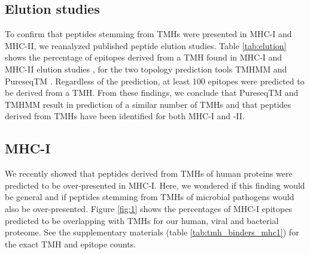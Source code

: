\subsection{Elution studies}



To confirm that peptides stemming from TMHs were presented in MHC-I and MHC-II,
we reanalyzed published peptide elution studies.
Table \ref{tab:elution} shows the percentage of epitopes derived 
from a TMH
found in MHC-I and MHC-II elution studies , 
for the two topology prediction tools TMHMM and PureseqTM . 
Regardless of the prediction, 
at least 100 epitopes were predicted to be derived from a TMH. 
From these findings, we conclude that PureseqTM and TMHMM 
result in prediction of a similar number of TMHs 
and that peptides derived from TMHs have been identified for both MHC-I and -II.

\subsection{MHC-I}

We recently showed that peptides derived from TMHs of human proteins 
were predicted to be over-presented in MHC-I. 
Here, we wondered if this finding would be general 
and if peptides stemming from TMHs of microbial pathogens 
would also be over-presented.
Figure \ref{fig:1} shows the percentages of MHC-I epitopes predicted to be overlapping 
with TMHs for our human, viral and bacterial proteome.
See the supplementary materials (table \ref{tab:tmh_binders_mhc1}) 
for the exact TMH and epitope counts.

